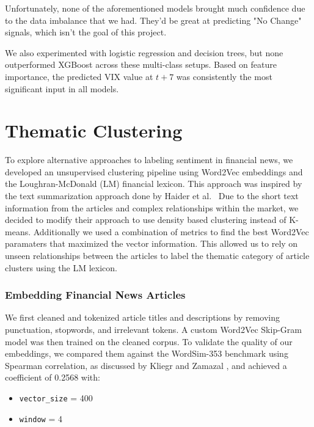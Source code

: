 \documentclass[twocolumn]{article}
\begin{document}
Unfortunately, none of the aforementioned models brought much confidence due to the data imbalance that we had. They'd be great at predicting "No Change" signals, which isn't the goal of this project.

We also experimented with logistic regression and decision trees, but none outperformed XGBoost across these multi-class setups. Based on feature importance, the predicted VIX value at $t+7$ was consistently the most significant input in all models.

\section{Thematic Clustering}
To explore alternative approaches to labeling sentiment in financial news, we developed an unsupervised clustering pipeline using Word2Vec embeddings and the Loughran-McDonald (LM) financial lexicon. This approach was inspired by the text summarization approach done by Haider et al.~\cite{9230670} Due to the short text information from the articles and complex relationships within the market, we decided to modify their approach to use density based clustering instead of K-means. Additionally we used a combination of metrics to find the best Word2Vec paramaters that maximized the vector information. This allowed us to rely on unseen relationships between the articles to label the thematic category of article clusters using the LM lexicon.

\subsubsection*{Embedding Financial News Articles}

We first cleaned and tokenized article titles and descriptions by removing punctuation, stopwords, and irrelevant tokens. A custom Word2Vec Skip-Gram model was then trained on the cleaned corpus. To validate the quality of our embeddings, we compared them against the WordSim-353 benchmark using Spearman correlation, as discussed by Kliegr and Zamazal \cite{KLIEGR2018174}, and achieved a coefficient of 0.2568 with:
\begin{itemize}
    \item \texttt{vector\_size} = 400
    \item \texttt{window} = 4
\end{itemize}
\end{document}
